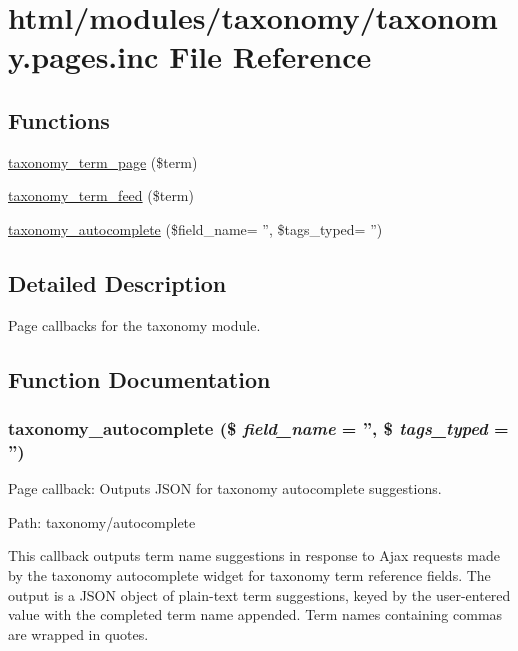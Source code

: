 \hypertarget{taxonomy_8pages_8inc}{
\section{html/modules/taxonomy/taxonomy.pages.inc File Reference}
\label{taxonomy_8pages_8inc}
}
\subsection*{Functions}
\begin{DoxyCompactItemize}
\item 
\hyperlink{taxonomy_8pages_8inc_a43b5178b66864e214a43196bd7b15c91}{taxonomy\_\-term\_\-page} (\$term)
\item 
\hyperlink{taxonomy_8pages_8inc_a8400d3de3b78abc951c0e1c6657c8fc1}{taxonomy\_\-term\_\-feed} (\$term)
\item 
\hyperlink{taxonomy_8pages_8inc_ac738ea7a02da7aad1b3dbb986939c7ce}{taxonomy\_\-autocomplete} (\$field\_\-name= '', \$tags\_\-typed= '')
\end{DoxyCompactItemize}


\subsection{Detailed Description}
Page callbacks for the taxonomy module. 

\subsection{Function Documentation}
\hypertarget{taxonomy_8pages_8inc_ac738ea7a02da7aad1b3dbb986939c7ce}{
\subsubsection[{taxonomy\_\-autocomplete}]{\setlength{\rightskip}{0pt plus 5cm}taxonomy\_\-autocomplete (\$ {\em field\_\-name} = {\ttfamily ''}, \/  \$ {\em tags\_\-typed} = {\ttfamily ''})}}
\label{taxonomy_8pages_8inc_ac738ea7a02da7aad1b3dbb986939c7ce}
Page callback: Outputs JSON for taxonomy autocomplete suggestions.

Path: taxonomy/autocomplete

This callback outputs term name suggestions in response to Ajax requests made by the taxonomy autocomplete widget for taxonomy term reference fields. The output is a JSON object of plain-\/text term suggestions, keyed by the user-\/entered value with the completed term name appended. Term names containing commas are wrapped in quotes.

